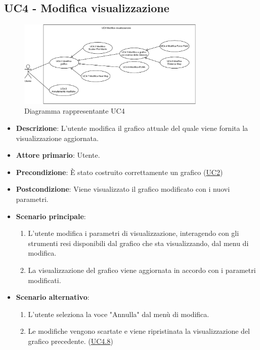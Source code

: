 \newpage
\subsection{UC4 - Modifica visualizzazione}
\label{sub:uc4}

\begin{figure}[h]
    \centering
    \includegraphics[width=0.8\textwidth]{componenti/casi-duso/diagrammi/UC4.pdf}
    \caption{Diagramma rappresentante UC4}
    \label{fig:UC4}
\end{figure}


\begin{itemize}
    \item \textbf{Descrizione}: L’utente modifica il grafico attuale del quale viene fornita la visualizzazione aggiornata.
	
    \item \textbf{Attore primario}: Utente.
    
    \item \textbf{Precondizione}:   È stato costruito correttamente un grafico (\hyperref[sub:uc2]{UC2})

    \item \textbf{Postcondizione}:  Viene visualizzato il grafico modificato con i nuovi parametri.

	\item \textbf{Scenario principale}:
		\begin{enumerate}
            \item L'utente modifica i parametri di visualizzazione, interagendo con gli strumenti resi disponibili dal grafico che sta visualizzando,
                    dal menu di modifica.
            \item La visualizzazione del grafico viene aggiornata in accordo con i parametri modificati.
        \end{enumerate}

    \item \textbf{Scenario alternativo}:
        \begin{enumerate}
            \item L'utente seleziona la voce "Annulla" dal menù di modifica.
            \item Le modifiche vengono scartate e viene ripristinata la visualizzazione del grafico precedente.  (\hyperref[ssub:uc4.8]{UC4.8})
        \end{enumerate}
    
\end{itemize}

